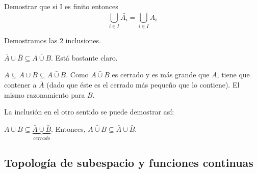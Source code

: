 \begin{problem}[11]
\ppart
\ppart

\solution
\spart
\spart  Demostrar que si I es finito entonces $$\bigcup_{i∈I} \bar{A_i} = \bar{\bigcup_{i∈I} A_i}$$

Demostramos las 2 inclusiones.

$\bar{A}∪\bar{B} \subseteq \bar{A∪B}$. Está bastante claro.

$A\subseteq A∪B \subseteq \bar{A∪B}$. Como $\bar{A∪B}$ es cerrado y es más grande que $A$, tiene que contener a $\bar{A}$ (dado que éste es el cerrado más pequeño que lo contiene). El mismo razonamiento para $B$.

La inclusión en el otro sentido se puede demostrar así:

$A∪B \subseteq \underbrace{\bar{A}∪\bar{B}}_{cerrado}$. Entonces, $\bar{A∪B}\subseteq \bar{A}∪\bar{B}$.
\end{problem}

\subsection{Topología de subespacio y funciones continuas}


